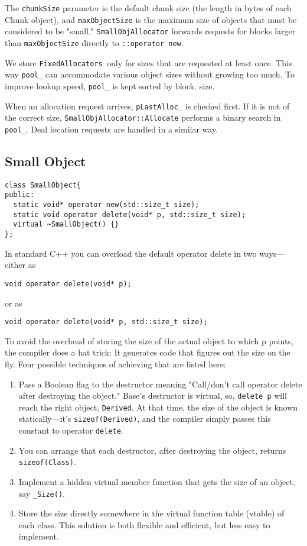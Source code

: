 The \texttt{chunkSize} parameter is the default chunk size (the length
in bytes of each Chunk object), and \texttt{maxObjectSize} is the
maximum size of objects that must be considered to be "small."
\texttt{SmallObjAllocator} forwards requests 
for blocks larger than \texttt{maxObjectSize} directly to
\texttt{::operator new}.

We store \texttt{FixedAllocators }only for sizes that are requested at
least once. This way \texttt{pool\_} can accommodate
various object sizes without growing too much. To improve lookup
speed, \texttt{pool\_} is kept sorted by block.
size.

When an allocation request arrives, \texttt{pLastAlloc\_} is checked first. If
it is not of the correct size, \texttt{SmallObjAllocator::Allocate}
performs a binary search in \texttt{pool\_}. Deal location requests are 
handled in a similar way.

\subsection{Small Object}

\begin{verbatim}
class SmallObject{
public:
  static void* operator new(std::size_t size);
  static void operator delete(void* p, std::size_t size);
  virtual ~SmallObject() {}
};
\end{verbatim}

 In standard C++ you can overload the default operator delete in two
 ways—either as
\begin{verbatim}
void operator delete(void* p);
\end{verbatim}
or as
\begin{verbatim}
void operator delete(void* p, std::size_t size);
\end{verbatim}

 To avoid the overhead of storing the size of the actual object to
 which p points, the compiler does a hat trick: It generates code that
 figures out the size on the fly. Four possible techniques of
 achieving that are listed here:
 \begin{enumerate}
 \item Pass a Boolean flag to the destructor meaning "Call/don't call
   operator delete after destroying the object." Base's destructor is
   virtual, so, \texttt{delete p} will reach the right object,
   \texttt{Derived}. At that time, the size of the object is known
   statically—it's \texttt{sizeof(Derived)}, and the compiler simply
   passes this constant to operator \texttt{delete}.
 \item You can arrange that each destructor, after destroying the
   object, returns \texttt{sizeof(Class)}.
 \item Implement a hidden virtual member function that gets the size
   of an object, say \texttt{\_Size()}.  
 \item Store the size directly somewhere in the virtual function table
   (vtable) of each class. This solution is both flexible and
   efficient, but less easy to implement.
 \end{enumerate}

